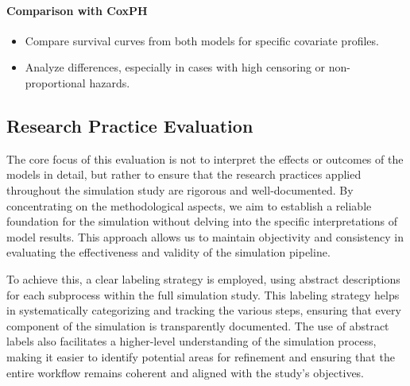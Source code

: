 \paragraph*{Comparison with CoxPH}
\begin{itemize}
    \item Compare survival curves from both models for specific covariate profiles.
    \item Analyze differences, especially in cases with high censoring or non-proportional hazards.
\end{itemize}

\subsection{Research Practice Evaluation}

The core focus of this evaluation is not to interpret the effects or outcomes of the models in detail, but rather to ensure that the research practices applied throughout the simulation study are rigorous and well-documented. By concentrating on the methodological aspects, we aim to establish a reliable foundation for the simulation without delving into the specific interpretations of model results. This approach allows us to maintain objectivity and consistency in evaluating the effectiveness and validity of the simulation pipeline.

To achieve this, a clear labeling strategy is employed, using abstract descriptions for each subprocess within the full simulation study. This labeling strategy helps in systematically categorizing and tracking the various steps, ensuring that every component of the simulation is transparently documented. The use of abstract labels also facilitates a higher-level understanding of the simulation process, making it easier to identify potential areas for refinement and ensuring that the entire workflow remains coherent and aligned with the study’s objectives.


